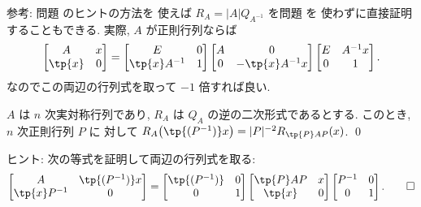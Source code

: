 \documentclass[12pt,twoside]{jarticle}
\begin{document}
\medskip
\noindent
参考: 問題  のヒントの方法を
使えば $R_A = |A| Q_{A^{-1}}$ を問題  を
使わずに直接証明することもできる.  実際, $A$ が正則行列ならば
\begin{equation*}
  \begin{bmatrix}
    A      & x \\
    \tp{x} & 0 \\
  \end{bmatrix}
  =
  \begin{bmatrix}
    E            & 0 \\
    \tp{x}A^{-1} & 1 \\
  \end{bmatrix}
  \begin{bmatrix}
    A & 0 \\
    0 & -\tp{x}A^{-1}x \\
  \end{bmatrix}
  \begin{bmatrix}
    E & A^{-1}x \\
    0 & 1 \\
  \end{bmatrix}.
\end{equation*}
なのでこの両辺の行列式を取って $-1$ 倍すれば良い. 


\begin{question}
\label{q:inv-q-form-3}
  $A$ は $n$ 次実対称行列であり,  $R_A$ は $Q_A$ の逆の二次形式であるとする.
  このとき, $n$ 次正則行列 $P$ に
  対して $R_A\bigl(\tp{(P^{-1})}x\bigr) 
  = |P|^{-2} R_{\tp{P}AP}(x)$.
  \qed
\end{question}

\noindent
ヒント: 次の等式を証明して両辺の行列式を取る:
\begin{equation*}
  \begin{bmatrix}
    A            & \tp{(P^{-1})}x \\
    \tp{x}P^{-1} & 0 \\
  \end{bmatrix}
  =
  \begin{bmatrix}
    \tp{(P^{-1})} & 0 \\
      0           & 1 \\
  \end{bmatrix}
  \begin{bmatrix}
    \tp{P}AP & x \\
     \tp{x}  & 0 \\
  \end{bmatrix}
  \begin{bmatrix}
    P^{-1} & 0 \\
       0   & 1 \\
  \end{bmatrix}.
  \qed
\end{equation*}
\end{document}
